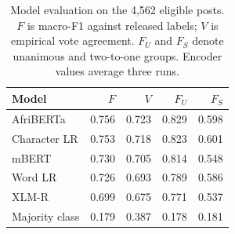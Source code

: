 \begin{table}[t]
\centering
\footnotesize
\caption{Model evaluation on the 4,562 eligible posts. $F$ is macro-F1 against released labels; $V$ is empirical vote agreement. $F_U$ and $F_S$ denote unanimous and two-to-one groups. Encoder values average three runs.}
\label{tab:disagreement}
\begin{tabular}{lrrrr}
\toprule
Model & $F$ & $V$ & $F_U$ & $F_S$ \\
\midrule
AfriBERTa & 0.756 & 0.723 & 0.829 & 0.598 \\
Character LR & 0.753 & 0.718 & 0.823 & 0.601 \\
mBERT & 0.730 & 0.705 & 0.814 & 0.548 \\
Word LR & 0.726 & 0.693 & 0.789 & 0.586 \\
XLM-R & 0.699 & 0.675 & 0.771 & 0.537 \\
Majority class & 0.179 & 0.387 & 0.178 & 0.181 \\
\bottomrule
\end{tabular}
\end{table}
